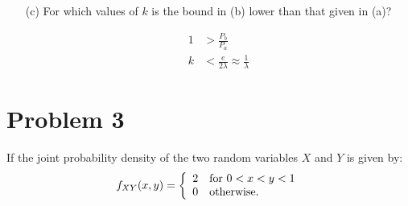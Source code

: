 \documentclass{article}
\newcommand{\1}{\mathbf{1}}
\begin{document}
\begin{enumerate}
    \item[(c)] For which values of $k$ is the bound in (b) lower than that given in (a)?
    
    \begin{align*}
        1 &> \frac{P_b}{P_a}\\
        k &< \frac{e}{2\lambda} \approx \frac{1}{\lambda}
    \end{align*}
\end{enumerate}



\newpage
\section*{Problem 3} 
If the joint probability density of the two random variables $X$ and $Y$ is given by:
$$ f_{XY}(x,y) =\left\{
    \begin{array}{ll}
        2 & \hbox{for } 0 < x < y <1 \\
        0 & \hbox{otherwise.}
    \end{array}
\right.$$
\end{document}
